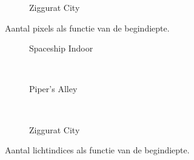 \begin{figure}[t]
\begin{minipage}[t]{0.5\textwidth}
  \begin{adjustbox}{minipage=\textwidth, scale=0.55}
    \begin{subfigure}[b]{1.6\textwidth}
      \centering
      \def\svgwidth{\textwidth}
      
      \caption{Ziggurat City}
      \label{fig:hs-sd-light-indices:city}
    \end{subfigure}
  \end{adjustbox}
  \caption{\small Aantal pixels als functie van de begindiepte.}
  \label{fig:hs-sd-light-indices}
  \end{minipage}%
  \begin{minipage}[t]{0.5\textwidth}
  \begin{adjustbox}{minipage=\textwidth, scale=0.55}
    \begin{subfigure}[b]{1.6\textwidth}
      \centering
      \def\svgwidth{\textwidth}
      
      \caption{Spaceship Indoor}
      \vspace{4pt}
      \label{fig:hs-sd-exec:indoor}
    \end{subfigure}
  \end{adjustbox} \\
  \begin{adjustbox}{minipage=\textwidth, scale=0.55}
    \begin{subfigure}[b]{1.6\textwidth}
      \centering
      \def\svgwidth{\textwidth}
      
      \caption{Piper's Alley}
      \vspace{4pt}
      \label{fig:hs-sd-exec:alley}
    \end{subfigure}
  \end{adjustbox} \\
  \begin{adjustbox}{minipage=\textwidth, scale=0.55}
    \begin{subfigure}[b]{1.6\textwidth}
      \centering
      \def\svgwidth{\textwidth}
      
      \caption{Ziggurat City}
      \label{fig:hs-sd-exec:city}
    \end{subfigure}
  \end{adjustbox}
  \caption{\small Aantal lichtindices als functie van de begindiepte.}
  \label{fig:hs-sd-exec}
  \end{minipage} 
\end{figure}

